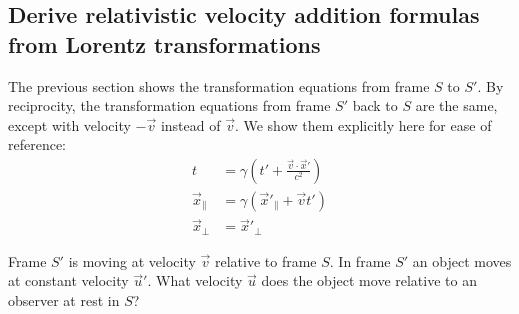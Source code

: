 \documentclass[a4paper]{article}
\theoremstyle{plain}
\theoremstyle{definition}
\newcommand{\vect}[1]{\vec{#1}}
\begin{document}
\subsection{Derive relativistic velocity addition formulas from Lorentz transformations}
\label{app:3d-derive-relativistic-velocity-addition-eqns}

The previous section shows the transformation equations from frame $S$
to $S'$.  By reciprocity, the transformation equations from frame $S'$
back to $S$ are the same, except with velocity $-\vect{v}$ instead of
$\vect{v}$.  We show them explicitly here for ease of reference:
\begin{align*}
t & = \gamma (t' + \frac{\vect{v} \cdot \vect{x}'}{c^2}) \\
\vect{x}_{\parallel} & = \gamma (\vect{x}'_{\parallel} + \vect{v}t') \\
\vect{x}_{\perp} & = \vect{x}'_{\perp}
\end{align*}

Frame $S'$ is moving at velocity $\vect{v}$ relative to frame $S$.
In frame $S'$ an object moves at constant velocity $\vect{u}'$.
What velocity $\vect{u}$ does the object move relative to
an observer at rest in $S$?
\end{document}
